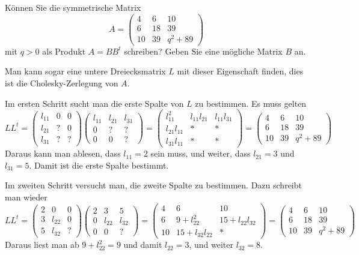 Können Sie die symmetrische Matrix
\[
A=\begin{pmatrix}
 4& 6&10\\
 6&18&39\\
10&39&q^2 + 89
\end{pmatrix}
\]
mit $q>0$ als Produkt $A=BB^t$ schreiben?
Geben Sie eine mögliche Matrix $B$ an.


\begin{loesung}
Man kann sogar eine untere Dreiecksmatrix $L$ mit dieser Eigenschaft finden,
dies ist die Cholesky-Zerlegung von $A$.

Im ersten Schritt sucht man die erste Spalte von $L$ zu bestimmen.
Es muss gelten
\[
LL^t=
\begin{pmatrix}
l_{11}&  0&  0\\
l_{21}&  ?&  0\\
l_{31}&  ?&  ?
\end{pmatrix}
\begin{pmatrix}
l_{11}&l_{21}&l_{31}\\
     0&     ?&     ?\\
     0&     0&     ?
\end{pmatrix}
=
\begin{pmatrix}
    l_{11}^2&l_{11}l_{21}&l_{11}l_{31}\\
l_{21}l_{11}&           *&           *\\
l_{31}l_{11}&           *&           *
\end{pmatrix}
=
\begin{pmatrix}
 4& 6&10\\
 6&18&39\\
10&39&q^2 + 89
\end{pmatrix}
\]
Daraus kann man ablesen, dass $l_{11}=2$ sein muss, und weiter,
dass
$l_{21}=3$ und $l_{31}=5$. Damit ist die erste Spalte bestimmt.

Im zweiten Schritt versucht man, die zweite Spalte zu bestimmen.
Dazu schreibt man wieder
\[
LL^t
=
\begin{pmatrix}
2&     0&0\\
3&l_{22}&0\\
5&l_{32}&?
\end{pmatrix}
\begin{pmatrix}
2&     3&     5\\
0&l_{22}&l_{32}\\
0&     0&?
\end{pmatrix}
=
\begin{pmatrix}
 4&              6&            10\\
 6& 9+l_{22}^2    &15+l_{22}l_{32}\\
10&15+l_{32}l_{22}&             *
\end{pmatrix}
=
\begin{pmatrix}
 4& 6&10\\
 6&18&39\\
10&39& q^2 + 89
\end{pmatrix}
\]
Daraus liest man ab $9+l_{22}^2=9$ und damit $l_{22}=3$, und weiter
$l_{32}=8$.


\end{loesung}
